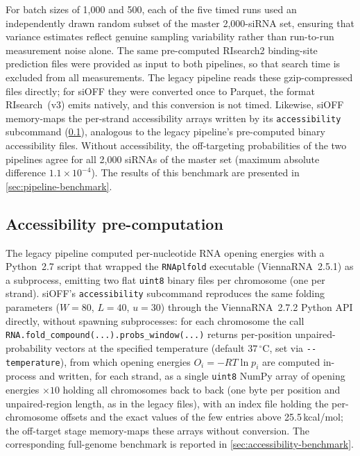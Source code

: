 \documentclass[11pt]{article}
\begin{document}
For batch sizes of 1{,}000 and 500, each of the five timed runs used an independently drawn random subset of the master 2{,}000-siRNA set, ensuring that variance estimates reflect genuine sampling variability rather than run-to-run measurement noise alone.
The same pre-computed RIsearch2 binding-site prediction files were provided as input to both pipelines, so that search time is excluded from all measurements.
The legacy pipeline reads these gzip-compressed files directly; for siOFF they were converted once to Parquet, the format RIsearch~(v3) emits natively, and this conversion is not timed.
Likewise, siOFF memory-maps the per-strand accessibility arrays written by its \texttt{accessibility} subcommand (\cref{sec:accessibility-method}), analogous to the legacy pipeline's pre-computed binary accessibility files.
Without accessibility, the off-targeting probabilities of the two pipelines agree for all 2{,}000 siRNAs of the master set (maximum absolute difference $1.1\times10^{-4}$).
The results of this benchmark are presented in \cref{sec:pipeline-benchmark}.

\subsection{Accessibility pre-computation}\label{sec:accessibility-method}

The legacy pipeline computed per-nucleotide RNA opening energies with a Python~2.7 script that wrapped the \texttt{RNAplfold} executable (ViennaRNA~2.5.1) as a subprocess, emitting two flat \texttt{uint8} binary files per chromosome (one per strand).
siOFF's \texttt{accessibility} subcommand reproduces the same folding parameters ($W{=}80$, $L{=}40$, $u{=}30$) through the ViennaRNA~2.7.2 Python API directly, without spawning subprocesses: for each chromosome the call \texttt{RNA.fold\_compound(...).probs\_window(...)} returns per-position unpaired-probability vectors at the specified temperature (default $37\,^\circ$C, set via \texttt{-{}-temperature}), from which opening energies $O_i = -RT\ln p_i$ are computed in-process and written, for each strand, as a single \texttt{uint8} NumPy array of opening energies $\times 10$ holding all chromosomes back to back (one byte per position and unpaired-region length, as in the legacy files), with an index file holding the per-chromosome offsets and the exact values of the few entries above 25.5\,kcal/mol; the off-target stage memory-maps these arrays without conversion.
The corresponding full-genome benchmark is reported in \cref{sec:accessibility-benchmark}.
\end{document}
